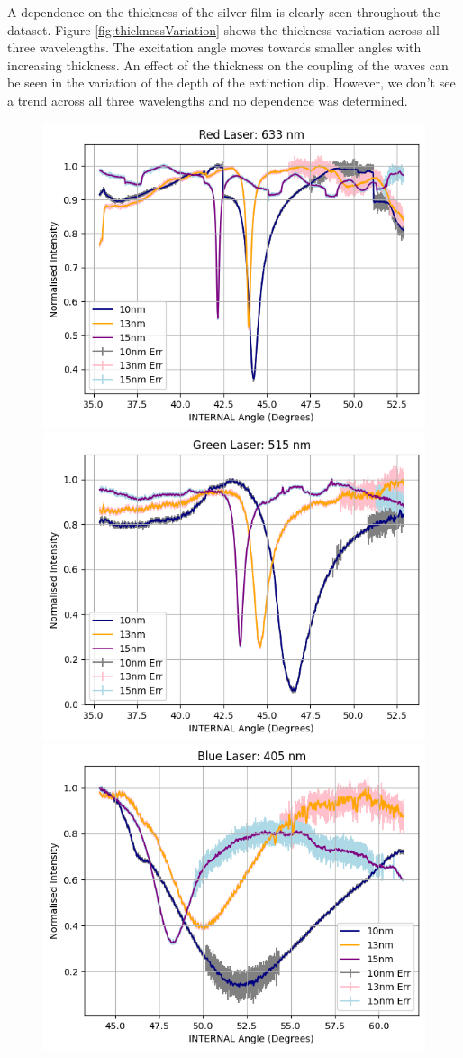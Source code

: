 \documentclass[%
reprint,
amsmath,amssymb,
aps,
]{revtex4-2}
\begin{document}
			A dependence on the thickness of the silver film is clearly seen throughout the dataset. Figure \ref{fig:thicknessVariation} shows the thickness variation across all three wavelengths. The excitation angle moves towards smaller angles with increasing thickness. An effect of the thickness on the coupling of the waves can be seen in the variation of the depth of the extinction dip. However, we don't see a trend across all three wavelengths and no dependence was determined.
			
			\begin{figure}
				\includegraphics[width=0.85\columnwidth]{redThicknessVariation.png}
				\includegraphics[width=0.85\columnwidth]{greenThicknessVariation.png}
				\includegraphics[width=0.85\columnwidth]{blueThicknessVariation.png}

\end{figure}
\end{document}
